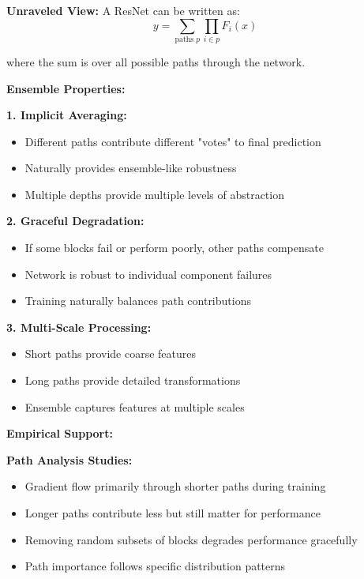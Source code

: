 \documentclass[12pt]{article}
\begin{document}
\begin{enumerate}[(a)]
{    \textbf{Unraveled View:}
    A ResNet can be written as:
    $$y = \sum_{\text{paths } p} \prod_{i \in p} F_i(x)$$
    
    where the sum is over all possible paths through the network.
    
    \textbf{Ensemble Properties:}
    
    \textbf{1. Implicit Averaging:}
    \begin{itemize}
        \item Different paths contribute different "votes" to final prediction
        \item Naturally provides ensemble-like robustness
        \item Multiple depths provide multiple levels of abstraction
    \end{itemize}
    
    \textbf{2. Graceful Degradation:}
    \begin{itemize}
        \item If some blocks fail or perform poorly, other paths compensate
        \item Network is robust to individual component failures
        \item Training naturally balances path contributions
    \end{itemize}
    
    \textbf{3. Multi-Scale Processing:}
    \begin{itemize}
        \item Short paths provide coarse features
        \item Long paths provide detailed transformations  
        \item Ensemble captures features at multiple scales
    \end{itemize}
    
    \textbf{Empirical Support:}
    
    \textbf{Path Analysis Studies:}
    \begin{itemize}
        \item Gradient flow primarily through shorter paths during training
        \item Longer paths contribute less but still matter for performance
        \item Removing random subsets of blocks degrades performance gracefully
        \item Path importance follows specific distribution patterns
    \end{itemize}
    
}
\end{enumerate}
\end{document}
